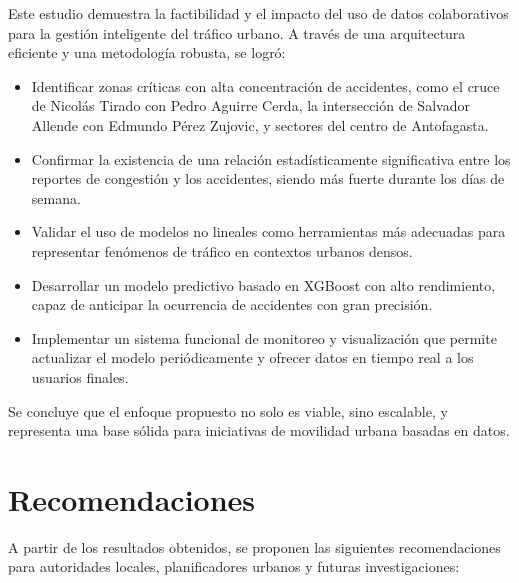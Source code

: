 \documentclass[12pt]{article}
\begin{document}
Este estudio demuestra la factibilidad y el impacto del uso de datos colaborativos para la gestión inteligente del tráfico urbano. A través de una arquitectura eficiente y una metodología robusta, se logró:

\begin{itemize}
    \item Identificar zonas críticas con alta concentración de accidentes, como el cruce de Nicolás Tirado con Pedro Aguirre Cerda, la intersección de Salvador Allende con Edmundo Pérez Zujovic, y sectores del centro de Antofagasta.
    \item Confirmar la existencia de una relación estadísticamente significativa entre los reportes de congestión y los accidentes, siendo más fuerte durante los días de semana.
    \item Validar el uso de modelos no lineales como herramientas más adecuadas para representar fenómenos de tráfico en contextos urbanos densos.
    \item Desarrollar un modelo predictivo basado en XGBoost con alto rendimiento, capaz de anticipar la ocurrencia de accidentes con gran precisión.
    \item Implementar un sistema funcional de monitoreo y visualización que permite actualizar el modelo periódicamente y ofrecer datos en tiempo real a los usuarios finales.
\end{itemize}

Se concluye que el enfoque propuesto no solo es viable, sino escalable, y representa una base sólida para iniciativas de movilidad urbana basadas en datos.

\section{Recomendaciones}

A partir de los resultados obtenidos, se proponen las siguientes recomendaciones para autoridades locales, planificadores urbanos y futuras investigaciones:
\end{document}
